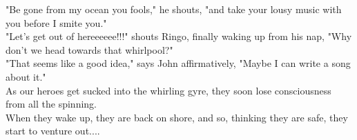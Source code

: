 \documentclass{article}
\begin{document}
"Be gone from my ocean you fools," he shouts, "and take your lousy music with you before I smite you."\\

"Let's get out of hereeeeee!!!" shouts Ringo, finally waking up from his nap, "Why don't we head towards that whirlpool?"\\

"That seems like a good idea," says John affirmatively, "Maybe I can write a song about it."\\

As our heroes get sucked into the whirling gyre, they soon lose consciousness from all the spinning.\\

When they wake up, they are back on shore, and so, thinking they are safe, they start to venture out....
\end{document}
